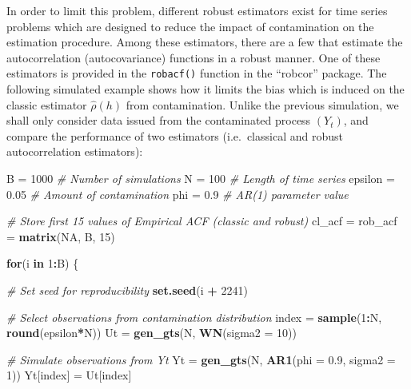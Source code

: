 \documentclass[]{book}
\newenvironment{Shaded}{\begin{snugshade}}{\end{snugshade}}
\newcommand{\KeywordTok}[1]{\textcolor[rgb]{0.13,0.29,0.53}{\textbf{#1}}}
\newcommand{\DataTypeTok}[1]{\textcolor[rgb]{0.13,0.29,0.53}{#1}}
\newcommand{\DecValTok}[1]{\textcolor[rgb]{0.00,0.00,0.81}{#1}}
\newcommand{\FloatTok}[1]{\textcolor[rgb]{0.00,0.00,0.81}{#1}}
\newcommand{\StringTok}[1]{\textcolor[rgb]{0.31,0.60,0.02}{#1}}
\newcommand{\CommentTok}[1]{\textcolor[rgb]{0.56,0.35,0.01}{\textit{#1}}}
\newcommand{\OtherTok}[1]{\textcolor[rgb]{0.56,0.35,0.01}{#1}}
\newcommand{\ControlFlowTok}[1]{\textcolor[rgb]{0.13,0.29,0.53}{\textbf{#1}}}
\newcommand{\OperatorTok}[1]{\textcolor[rgb]{0.81,0.36,0.00}{\textbf{#1}}}
\newcommand{\NormalTok}[1]{#1}
\theoremstyle{definition}
\theoremstyle{definition}
\theoremstyle{definition}
\theoremstyle{remark}
\begin{document}
In order to limit this problem, different robust estimators exist for
time series problems which are designed to reduce the impact of
contamination on the estimation procedure. Among these estimators, there
are a few that estimate the autocorrelation (autocovariance) functions
in a robust manner. One of these estimators is provided in the
\texttt{robacf()} function in the ``robcor'' package. The following
simulated example shows how it limits the bias which is induced on the
classic estimator \(\hat{\rho}(h)\) from contamination. Unlike the
previous simulation, we shall only consider data issued from the
contaminated process \((Y_t)\), and compare the performance of two
estimators (i.e.~classical and robust autocorrelation estimators):

\begin{Shaded}
\begin{Highlighting}[]
\NormalTok{B =}\StringTok{ }\DecValTok{1000} \CommentTok{# Number of simulations}
\NormalTok{N =}\StringTok{ }\DecValTok{100} \CommentTok{# Length of time series}
\NormalTok{epsilon =}\StringTok{ }\FloatTok{0.05} \CommentTok{# Amount of contamination}
\NormalTok{phi =}\StringTok{ }\FloatTok{0.9} \CommentTok{# AR(1) parameter value}

\CommentTok{# Store first 15 values of Empirical ACF (classic and robust)}
\NormalTok{cl_acf =}\StringTok{ }\NormalTok{rob_acf =}\StringTok{ }\KeywordTok{matrix}\NormalTok{(}\OtherTok{NA}\NormalTok{, B, }\DecValTok{15}\NormalTok{)}

\ControlFlowTok{for}\NormalTok{(i }\ControlFlowTok{in} \DecValTok{1}\OperatorTok{:}\NormalTok{B) \{}
  
  \CommentTok{# Set seed for reproducibility}
  \KeywordTok{set.seed}\NormalTok{(i }\OperatorTok{+}\StringTok{ }\DecValTok{2241}\NormalTok{)}

  \CommentTok{# Select observations from contamination distribution}
\NormalTok{  index =}\StringTok{ }\KeywordTok{sample}\NormalTok{(}\DecValTok{1}\OperatorTok{:}\NormalTok{N, }\KeywordTok{round}\NormalTok{(epsilon}\OperatorTok{*}\NormalTok{N))}
\NormalTok{  Ut =}\StringTok{ }\KeywordTok{gen_gts}\NormalTok{(N, }\KeywordTok{WN}\NormalTok{(}\DataTypeTok{sigma2 =} \DecValTok{10}\NormalTok{))}

  \CommentTok{# Simulate observations from  Yt}
\NormalTok{  Yt =}\StringTok{ }\KeywordTok{gen_gts}\NormalTok{(N, }\KeywordTok{AR1}\NormalTok{(}\DataTypeTok{phi =} \FloatTok{0.9}\NormalTok{, }\DataTypeTok{sigma2 =} \DecValTok{1}\NormalTok{))}
\NormalTok{  Yt[index] =}\StringTok{ }\NormalTok{Ut[index]}
  

\end{Highlighting}
\end{Shaded}
\end{document}

